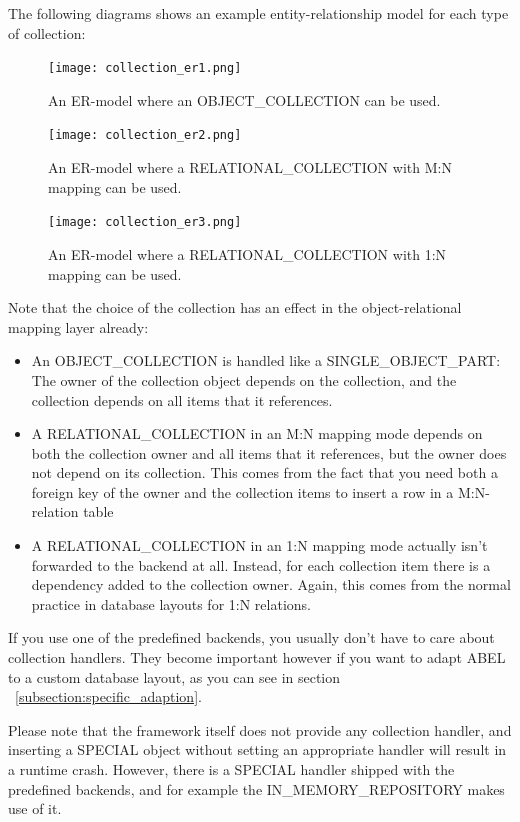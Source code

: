 The following diagrams shows an example entity-relationship model for each type of collection:

\begin{figure} [!h]
\centering
\texttt{[image: collection\_er1.png]}
\caption{An ER-model where an OBJECT\_COLLECTION can be used.}
\label{fig:backend_classes}
\end{figure}

\begin{figure} [!h]
\centering
\texttt{[image: collection\_er2.png]}
\caption{An ER-model where a RELATIONAL\_COLLECTION with M:N mapping can be used.}
\label{fig:backend_classes}
\end{figure}

\begin{figure} [!h]
\centering
\texttt{[image: collection\_er3.png]}
\caption{An ER-model where a RELATIONAL\_COLLECTION with 1:N mapping can be used.}
\label{fig:backend_classes}
\end{figure}


Note that the choice of the collection has an effect in the object-relational mapping layer already:
\begin{itemize}
 \item An OBJECT\_COLLECTION is handled like a SINGLE\_OBJECT\_PART: The owner of the collection object depends on the collection, and the collection depends on all items that it references.
 \item A RELATIONAL\_COLLECTION in an M:N mapping mode depends on both the collection owner and all items that it references, but the owner does not depend on its collection.
 This comes from the fact that you need both a foreign key of the owner and the collection items to insert a row in a M:N-relation table
 \item A RELATIONAL\_COLLECTION in an 1:N mapping mode actually isn't forwarded to the backend at all. Instead, for each collection item there is a dependency added to the collection owner.
 Again, this comes from the normal practice in database layouts for 1:N relations.
\end{itemize}


If you use one of the predefined backends, you usually don't have to care about collection handlers.
They become important however if you want to adapt ABEL to a custom database layout, as you can see in section ~\ref{subsection:specific_adaption}.

Please note that the framework itself does not provide any collection handler, and inserting a SPECIAL object without setting an appropriate handler will result in a runtime crash.
However, there is a SPECIAL handler shipped with the predefined backends, and for example the IN\_MEMORY\_REPOSITORY makes use of it.

